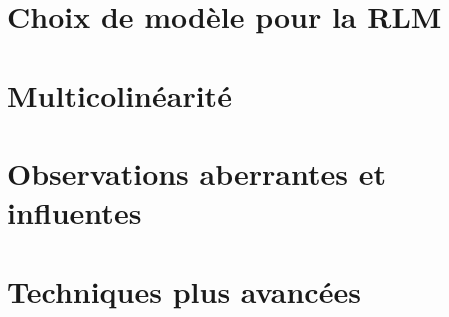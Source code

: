 \documentclass[11pt,oneside,openany]{book}
\begin{document}
\chapter{Choix de modèle pour la RLM}\label{sec:ChoixModeleRLM}
\minitoc \mtcskip \minilof


\chapter{Multicolinéarité}\label{sec:Multicolinéarité}
\minitoc \mtcskip \minilof


\chapter{Observations aberrantes et influentes}\label{sec:DonneesInfluentes}
\minitoc \mtcskip \minilof


\chapter{Techniques plus avancées}\label{sec:TechniquesAvancees}
\minitoc \mtcskip \minilof




\end{document}
